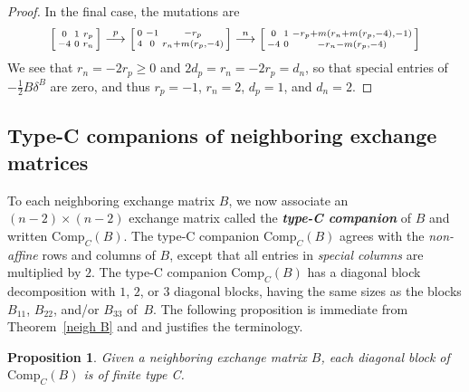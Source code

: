 \documentclass{amsart}
\newtheorem{proposition}{Proposition}[section]
\theoremstyle{definition}
\theoremstyle{remark}
\numberwithin{equation}{section}
\newcommand{\newword}[1]{\textbf{\emph{#1}}}
\newcommand{\0}{{\mathbf{0}}}
\newcommand{\Comp}{\mathrm{Comp}_C}
\begin{document}
\begin{proof}
In the final case, the mutations are
\[\begin{bsmallmatrix*}
0 & 1 & r_p\\
-4 & 0 &r_n
\end{bsmallmatrix*}\overset{p}{\longrightarrow} 
\begin{bsmallmatrix*}
0 & -1 & -r_p\\
4 & 0 &r_n+m(r_p,-4)
\end{bsmallmatrix*}\overset{n}{\longrightarrow} 
\begin{bsmallmatrix*}
0 & 1 &-r_p+m(r_n+m(r_p,-4),-1)\\
-4 & 0 &-r_n-m(r_p,-4)
\end{bsmallmatrix*}
\]
We see that $r_n=-2r_p\ge0$ and $2d_p=r_n=-2r_p=d_n$, so that special entries of~$-\frac12B\delta^B$ are zero, and thus $r_p=-1$, $r_n=2$, $d_p=1$, and $d_n=2$.
\end{proof}

\subsection{Type-C companions of neighboring exchange matrices}\label{type C}
To each neighboring exchange matrix $B$, we now associate an $(n-2)\times(n-2)$ exchange matrix called the \newword{type-C companion} of $B$ and written $\Comp(B)$.
The type-C companion $\Comp(B)$ agrees with the \emph{non-affine} rows and columns of $B$, except that all entries in \emph{special columns} are multiplied by $2$.
The type-C companion $\Comp(B)$ has a diagonal block decomposition with $1$, $2$, or $3$ diagonal blocks, having the same sizes as the blocks $B_{11}$, $B_{22}$, and/or $B_{33}$ of~$B$.
The following proposition is immediate from Theorem~\ref{neigh B} and \cite[Proposition~3.3]{NS14} and justifies the terminology.

\begin{proposition}\label{Comp is C}
Given a neighboring exchange matrix $B$, each diagonal block of $\Comp(B)$ is of finite type C.
\end{proposition}
%
\end{document}
